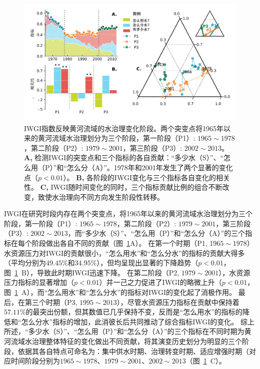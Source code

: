
\begin{figure}[ht!]
	\centering
	\includegraphics[width=\textwidth]{img/ch4/ch4_index.png}
	\caption[IWGI指数反映黄河流域的水治理变化阶段]{IWGI指数反映黄河流域的水治理变化阶段。两个突变点将1965年以来的黄河流域水治理划分为三个阶段，第一阶段（P1）: $1965 \sim 1978$，第二阶段（P2）: $1979 \sim 2001$，第三阶段（P3）: $2002 \sim 2013$。
	\textbf{A,} 检测IWGI的突变点和三个指标的各自贡献：“多少水（S）”、“怎么用（P）”和“怎么分（A）”。1978年和2001年发生了两个显著的变化点（$p<0.01$）。
	\textbf{B,}  各阶段的IWGI变化与三个指标各自变化的相关性。
	\textbf{C,} IWGI随时间变化的同时，三个指标贡献比例的组合不断改变，致使水治理向不同方向发生阶段性转移。
	}\label{ch4:fig:IWGI}
\end{figure}

IWGI在研究时段内存在两个突变点，将1965年以来的黄河流域水治理划分为三个阶段，第一阶段（P1）: $1965 \sim 1978$，第二阶段（P2）: $1979 \sim 2001$，第三阶段（P3）: $2002 \sim 2013$，而“多少水（S）”、“怎么用（P）”和“怎么分（A）”的三个指标在每个阶段做出各自不同的贡献（图~\ref{ch4:fig:IWGI}A）。
在第一个时期（P1, $1965 \sim 1978$）水资源压力对IWGI的贡献很小，“怎么用水”和“怎么分水”的指标的贡献大得多（平均分别为$49.45\%$和$34.95\%$），但均呈现出显著的下降趋势（$p<0.01$，图~\ref{ch4:fig:IWGI}~B），导致此时期IWGI迅速下降。
在第二阶段（P2, $1979 \sim 2001$），水资源压力指标的显著增加（$p<0.01$）并一己之力促进了IWGI的略微上升（$p<0.01$，图~\ref{ch4:fig:IWGI}~A），而“怎么用水”和“怎么分水”的指标对IWGI的变化起了消极作用。
最后，在第三个时期（P3, $1995 \sim 2013$），尽管水资源压力指标在贡献中保持着$57.11\%$的最突出份额，但其数值已几乎保持不变，反而是“怎么用水”的指标的降低和“怎么分水”指标的增加，此消彼长后共同推动了综合指标IWGI的变化。
综上所述，“多少水（S）”、“怎么用（P）”和“怎么分（A）”的三个指标在不同时期为黄河流域水治理整体特征的变化做出不同贡献，将其演变历史划分为明显的三个阶段，依据其各自特点可命名为：集中供水时期、治理转变时期、适应增强时期（对应时间阶段分别为$1965 \sim 1978$、$1979 \sim 2001$、$2002 \sim 2013$（图~\ref{ch4:fig:IWGI}~C）。
